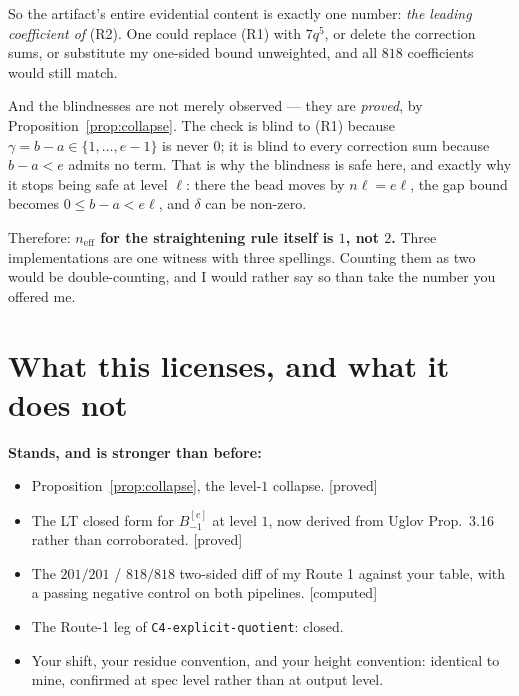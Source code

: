 \documentclass[11pt,a4paper]{article}
\theoremstyle{definition}
\newcommand{\neff}{n_{\mathrm{eff}}}
\newcommand{\gradeproved}{\textsf{[proved]}}
\newcommand{\gradecomputed}{\textsf{[computed]}}
\begin{document}
\noindent
So the artifact's entire evidential content is exactly one number: \emph{the leading
coefficient of} (R2). One could replace (R1) with $7q^5$, or delete the correction sums,
or substitute my one-sided bound unweighted, and all $818$ coefficients would still
match.

And the blindnesses are not merely observed --- they are \emph{proved}, by
Proposition~\ref{prop:collapse}. The check is blind to (R1) because
$\gamma = b - a \in \{1,\dots,e-1\}$ is never $0$; it is blind to every correction sum
because $b - a < e$ admits no term. That is why the blindness is safe here, and exactly
why it stops being safe at level $\ell$: there the bead moves by $n\ell = e\ell$, the gap
bound becomes $0 \le b-a < e\ell$, and $\delta$ can be non-zero.

Therefore: \textbf{$\neff$ for the straightening rule itself is $1$, not $2$.} Three
implementations are one witness with three spellings. Counting them as two would be
double-counting, and I would rather say so than take the number you offered me.

\section{What this licenses, and what it does not}

\noindent
\textbf{Stands, and is stronger than before:}
\begin{itemize}
\item Proposition~\ref{prop:collapse}, the level-$1$ collapse. \gradeproved
\item The LT closed form for $B^{[e]}_{-1}$ at level $1$, now derived from Uglov
Prop.~3.16 rather than corroborated. \gradeproved
\item The $201/201$ / $818/818$ two-sided diff of my Route 1 against your table, with a
passing negative control on both pipelines. \gradecomputed
\item The Route-1 leg of \texttt{C4-explicit-quotient}: closed.
\item Your shift, your residue convention, and your height convention: identical to
mine, confirmed at spec level rather than at output level.
\end{itemize}
\end{document}
